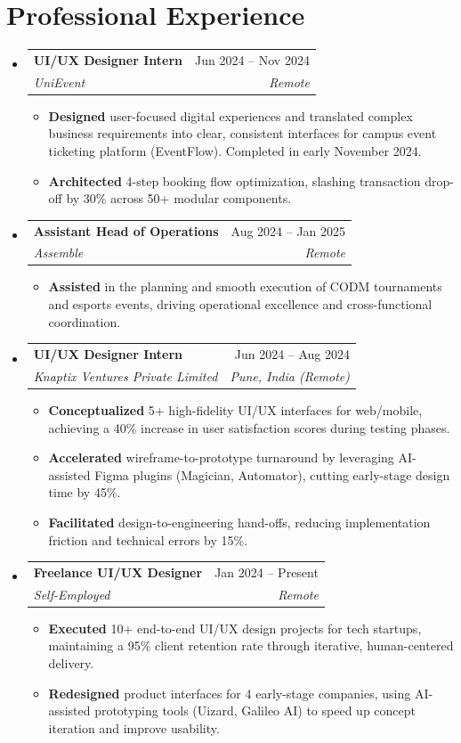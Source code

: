 \documentclass[letterpaper,10.5pt]{article}
\makeatletter
\newcommand{\resumeItem}[1]{
  \item\small{
    {#1 \vspace{-2pt}}
  }
}
\newcommand{\resumeSubheading}[4]{
  \vspace{-2pt}\item
    \begin{tabular*}{0.97\textwidth}[t]{l@{\extracolsep{\fill}}r}
      \textbf{#1} & #2 \\
      \textit{\small#3} & \textit{\small #4} \\
    \end{tabular*}\vspace{-6pt}
}
\newcommand{\resumeSubHeadingListStart}{\begin{itemize}[leftmargin=0.15in, label={}]}
\newcommand{\resumeSubHeadingListEnd}{\end{itemize}\vspace{-3pt}}
\newcommand{\resumeItemListStart}{\begin{itemize}[leftmargin=0.15in, label={}]}
\newcommand{\resumeItemListEnd}{\end{itemize}\vspace{-5pt}}
\makeatother
\begin{document}
\vspace{-4pt}

\section{Professional Experience}
\resumeSubHeadingListStart

  \resumeSubheading
    {UI/UX Designer Intern}{Jun 2024 -- Nov 2024}
    {UniEvent}{Remote}
    \resumeItemListStart
      \resumeItem{\textbf{Designed} user-focused digital experiences and translated complex business requirements into clear, consistent interfaces for campus event ticketing platform (EventFlow). Completed in early November 2024.}
      \resumeItem{\textbf{Architected} 4-step booking flow optimization, slashing transaction drop-off by 30\% across 50+ modular components.}
    \resumeItemListEnd

  \resumeSubheading
    {Assistant Head of Operations}{Aug 2024 -- Jan 2025}
    {Assemble}{Remote}
    \resumeItemListStart
      \resumeItem{\textbf{Assisted} in the planning and smooth execution of CODM tournaments and esports events, driving operational excellence and cross-functional coordination.}
    \resumeItemListEnd

  \resumeSubheading
    {UI/UX Designer Intern}{Jun 2024 -- Aug 2024}
    {Knaptix Ventures Private Limited}{Pune, India (Remote)}
    \resumeItemListStart
      \resumeItem{\textbf{Conceptualized} 5+ high-fidelity UI/UX interfaces for web/mobile, achieving a 40\% increase in user satisfaction scores during testing phases.}
      \resumeItem{\textbf{Accelerated} wireframe-to-prototype turnaround by leveraging AI-assisted Figma plugins (Magician, Automator), cutting early-stage design time by 45\%.}
      \resumeItem{\textbf{Facilitated} design-to-engineering hand-offs, reducing implementation friction and technical errors by 15\%.}
    \resumeItemListEnd

  \resumeSubheading
    {Freelance UI/UX Designer}{Jan 2024 -- Present}
    {Self-Employed}{Remote}
    \resumeItemListStart
      \resumeItem{\textbf{Executed} 10+ end-to-end UI/UX design projects for tech startups, maintaining a 95\% client retention rate through iterative, human-centered delivery.}
      \resumeItem{\textbf{Redesigned} product interfaces for 4 early-stage companies, using AI-assisted prototyping tools (Uizard, Galileo AI) to speed up concept iteration and improve usability.}
    \resumeItemListEnd

\resumeSubHeadingListEnd
\end{document}
